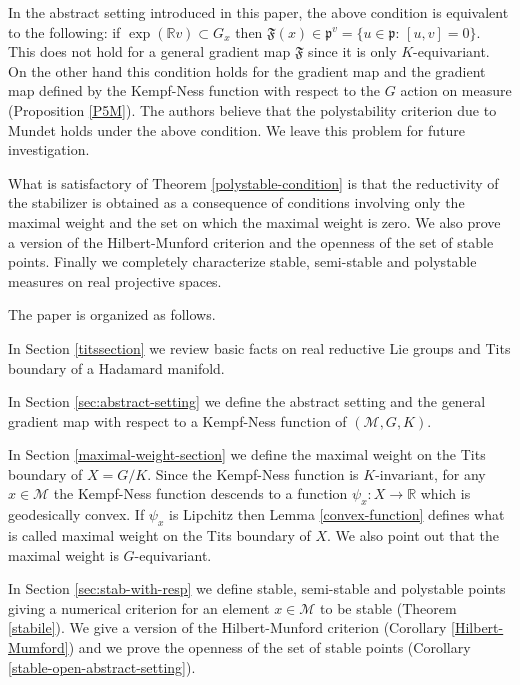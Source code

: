 \documentclass[leqno,11pt, a4]{amsart}
\theoremstyle{named}
\begin{document}
In the abstract setting introduced in this paper, the above condition is equivalent to the following: if $\exp({\mathbb{R}} {{v}})\subset G_x$ then ${\mathfrak{F}} (x)\in {\mathfrak{p}}^{{v}}=\{u\in {\mathfrak{p}}:\, [u,{{v}}]=0\}$. This does not hold for a  general gradient map ${\mathfrak{F}}$ since it is only $K$-equivariant. On the other hand this condition holds for the gradient map \cite{heinzner-schwarz-stoetzel} and the gradient map defined by the Kempf-Ness function with respect to the $G$ action on measure (Proposition \ref{P5M}). The authors believe that the polystability criterion due to Mundet \cite{mundet-Trans} holds under the above condition. We leave this problem for future investigation.

What is satisfactory of  Theorem  \ref{polystable-condition} is that the reductivity of the stabilizer is obtained as a consequence of conditions  involving only the maximal weight and the set on which the maximal weight is zero.
We also prove a version of the Hilbert-Munford criterion and the openness of the set of stable points.
Finally we completely characterize stable, semi-stable and polystable measures on  real projective spaces.

The paper is organized as follows.

In Section \ref{titssection} we review basic facts on real reductive Lie groups and Tits boundary of a Hadamard manifold.

In Section \ref{sec:abstract-setting} we define the abstract setting and the general gradient map with respect to a Kempf-Ness function of $({\mathscr{M}}, G,K)$.

In Section \ref{maximal-weight-section} we define the maximal weight on the Tits boundary of $X=G/K$. Since the Kempf-Ness function is $K$-invariant, for any $x\in {\mathscr{M}}$  the Kempf-Ness function descends to a function $\psi_x :X {\longrightarrow} {\mathbb{R}}$ which is geodesically convex. If $\psi_x$ is Lipchitz then Lemma \ref{convex-function} defines what is called  maximal weight on the Tits boundary of $X$. We also point out that the maximal weight is $G$-equivariant.

In Section \ref{sec:stab-with-resp} we define  stable, semi-stable and polystable points giving a numerical criterion for an element $x\in {\mathscr{M}}$
to be stable (Theorem \ref{stabile}). We give a version of the Hilbert-Munford criterion (Corollary \ref{Hilbert-Mumford}) and we prove the openness of the set of stable points (Corollary \ref{stable-open-abstract-setting}).
\end{document}
